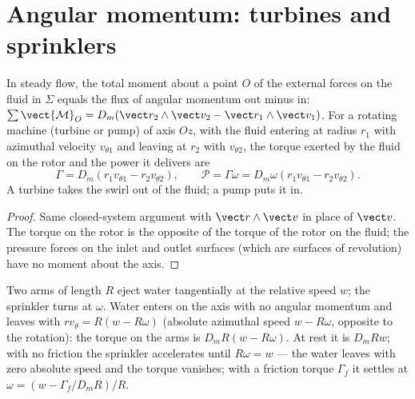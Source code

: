 \section{Angular momentum: turbines and sprinklers}

\begin{theorem}\label{thm:b2:flow-balances:angular}
In steady flow, the total moment about a point $O$ of the external
forces on the fluid in $\Sigma$ equals the flux of angular momentum
out minus in: $\sum\vect{\mathcal M}_O = D_m(\vect r_2\wedge\vect v_2 - \vect r_1
\wedge\vect v_1)$. For a rotating machine (turbine or pump) of axis $Oz$,
with the fluid entering at radius $r_1$ with azimuthal velocity
$v_{\theta1}$ and leaving at $r_2$ with $v_{\theta2}$, the torque exerted by
the fluid on the rotor and the power it delivers are
\[
\Gamma = D_m(r_1v_{\theta1} - r_2v_{\theta2}) , \qquad
\mathcal P = \Gamma\omega = D_m\omega(r_1v_{\theta1} - r_2v_{\theta2}) .
\]
A turbine takes the swirl out of the fluid; a pump puts it in.
\end{theorem}

\begin{proof}
Same closed-system argument with $\vect r\wedge\vect v$ in place of
$\vect v$. The torque on the rotor is the opposite of the torque of the
rotor on the fluid; the pressure forces on the inlet and outlet
surfaces (which are surfaces of revolution) have no moment about the
axis.
\end{proof}

\begin{example}\label{ex:b2:flow-balances:sprinkler}
Two arms of length $R$ eject water tangentially at the relative speed
$w$; the sprinkler turns at $\omega$. Water enters on the axis with no
angular momentum and leaves with $r v_\theta = R(w - R\omega)$ (absolute
azimuthal speed $w - R\omega$, opposite to the rotation): the torque on the
arms is $D_mR(w - R\omega)$. At rest it is $D_mRw$; with no friction the
sprinkler accelerates until $R\omega = w$ --- the water leaves with zero
absolute speed and the torque vanishes; with a friction torque
$\Gamma_f$ it settles at $\omega = (w - \Gamma_f/D_mR)/R$.
\end{example}

